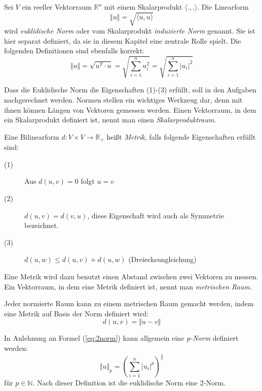 \begin{definition}
Sei $V$ ein reeller Vektorraum $\mathbb{R}^n$ mit einem Skalarprodukt $\langle .,.\rangle$. Die Linearform 
\[
\Vert u \Vert = \sqrt{\langle u,u \rangle}
\]
wird \textsl{euklidische Norm} oder vom Skalarprodukt \textsl{induzierte Norm} genannt. Sie ist hier separat definiert, da sie in diesem Kapitel eine zentrale Rolle spielt. Die folgenden Definitionen sind ebenfalls korrekt:
\begin{equation}\label{eq:2norm}
\Vert u \Vert = \sqrt{u^T \cdot u} = \sqrt{\sum_{i=1}^{n} u_i^2}= \sqrt{\sum_{i=1}^{n} \vert u_i \vert^2}
\end{equation}
\end{definition}

Dass die Euklidische Norm die Eigenschaften (1)-(3) erfüllt, soll in den Aufgaben nachgerechnet werden. Normen stellen ein wichtiges Werkzeug dar, denn mit ihnen können Längen von Vektoren gemessen werden. Einen Vektorraum, in dem ein Skalarprodukt definiert ist, nennt man einen \textsl{Skalarproduktraum}.

\begin{definition}
Eine Bilinearform $d : V\times V \longrightarrow \mathbb{R}_+$ heißt \textsl{Metrik}, falls folgende Eigenschaften erfüllt sind:
\begin{description}
\item[(1)] Aus $d(u,v) = 0$ folgt $u=v$
\item[(2)] $d(u,v) = d(v,u)$, diese Eigenschaft wird auch als Symmetrie bezeichnet.
\item[(3)] $d(u,w) \le d(u,v) + d(u,w)$ (Dreiecksungleichung)
\end{description}
\end{definition}

Eine Metrik wird dazu benutzt einen Abstand zwischen zwei Vektoren zu messen. Ein Vektorraum, in dem eine Metrik definiert ist, nennt man \textsl{metrischen Raum}. 

\begin{definition}
Jeder normierte Raum kann zu einem metrischen Raum gemacht werden, indem eine Metrik auf Basis der Norm definiert wird:
\[
d(u,v) = \Vert u-v \Vert
\]
\end{definition}

\begin{definition}
In Anlehnung an Formel (\ref{eq:2norm}) kann allgemein eine \textsl{p-Norm} definiert werden:
\[
\Vert u \Vert_p = \left( \sum_{i=1}^{n} \vert u_i \vert^p \right)^{\frac{1}{p}}
\]
für $p\in \mathbb{N}$. Nach dieser Definition ist die euklidische Norm eine 2-Norm. 
\end{definition}

